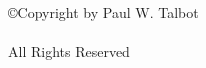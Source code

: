 
\thispagestyle{empty}

\belowSecSkip

\vspace*{2.5in}

\begin{center}
	\copyright Copyright by Paul W. Talbot \\
	\myDefenseDate \\
	All Rights Reserved
\end{center}

